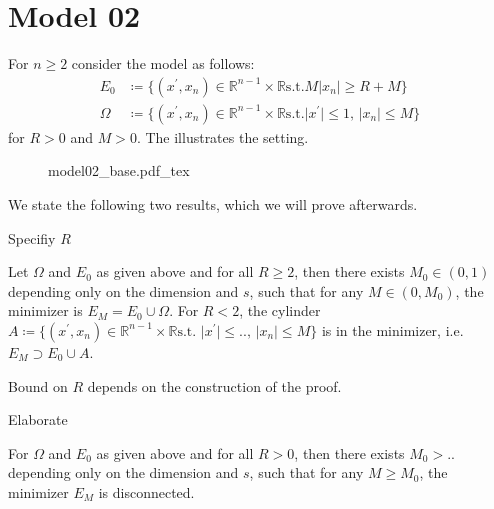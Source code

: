 \section{Model 02}
\label{sec:model02}

For \( n \geq 2 \) consider the model as follows:
\begin{align*}
	E_0    & \coloneqq \{(x^\prime, x_n) \in \mathbb{R}^{n - 1} \times \mathbb{R} \text{s.t.} M \lvert x_n \rvert \geq R + M \} \\
	\Omega & \coloneqq \{(x^\prime, x_n) \in \mathbb{R}^{n - 1} \times \mathbb{R} \text{s.t.} \lvert x^\prime \rvert \leq 1, \, \lvert x_n \rvert \leq M \}
\end{align*}
for \( R > 0 \) and \( M > 0 \). The  illustrates the setting.

\begin{figure}[h]
	\centering
	\def\svgwidth{0.5\textwidth}
	{model02_base.pdf_tex}
	\caption{}
	\label{fig:104}
\end{figure}

We state the following two results, which we will prove afterwards.

\begin{TODO}
	Specifiy \( R \)
\end{TODO}
\begin{theorem}
	\label{thm:103}
	Let \( \Omega \) and \( E_0 \) as given above and for all \( R \geq 2 \), then there
	exists \( M_0 \in (0, 1) \) depending only on the dimension and \( s \), such that
	for any \( M \in (0, M_0) \), the minimizer is \( E_M = E_0 \cup \Omega \). For \( R
	< 2 \), the cylinder \( A \coloneqq \{(x^\prime, x_n) \in \mathbb{R}^{n - 1} \times
	\mathbb{R} \text{s.t.~} \lvert x^\prime \rvert \leq.., \, \lvert x_n \rvert \leq M
	\} \) is in the minimizer, i.e.\ \( E_M \supset E_0 \cup A \).
\end{theorem}
\begin{note}
	Bound on \( R \) depends on the construction of the proof.
	\begin{TODO}
		Elaborate
	\end{TODO}
\end{note}

\begin{theorem}
	\label{thm:104}
	For \( \Omega \) and \( E_0 \) as given above and for all \( R > 0 \), then there
	exists \( M_0 >.. \) depending only on the dimension and \( s \), such that
	for any \( M \geq M_0 \), the minimizer \( E_M \) is disconnected.
\end{theorem}


